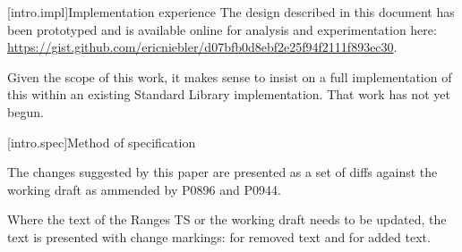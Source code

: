 [intro.impl]{Implementation experience}
\pnum
The design described in this document has been prototyped and is available
online for analysis and experimentation here: 
\url{https://gist.github.com/ericniebler/d07bfb0d8ebf2e25f94f2111f893ec30}.

\pnum
Given the scope of this work, it makes sense to insist on a full implementation
of this within an existing Standard Library implementation. That work has not
yet begun.

[intro.spec]{Method of specification}

\pnum
The changes suggested by this paper are presented as a set of diffs against
the working draft as ammended by P0896 and P0944.

\pnum
Where the text of the Ranges TS or the working draft needs to be updated,
the text is presented with change markings:  for
removed text and  for added text.

